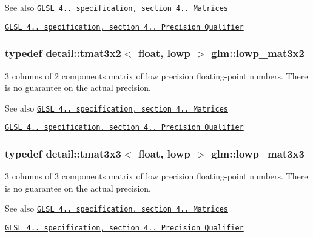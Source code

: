 \begin{DoxySeeAlso}{See also}
\href{http://www.opengl.org/registry/doc/GLSLangSpec.4.20.8.pdf}{\tt G\+L\+SL 4.. specification, section 4.. Matrices} 

\href{http://www.opengl.org/registry/doc/GLSLangSpec.4.20.8.pdf}{\tt G\+L\+SL 4.. specification, section 4.. Precision Qualifier} 
\end{DoxySeeAlso}
\subsubsection[{\texorpdfstring{lowp\+\_\+mat3x2}{lowp_mat3x2}}]{\setlength{\rightskip}{0pt plus 5cm}typedef detail\+::tmat3x2$<$ float, lowp $>$ {\bf glm\+::lowp\+\_\+mat3x2}}\hypertarget{group__core__precision_ga17219f89f804dbf4620d4caacf32cfe2}{}\label{group__core__precision_ga17219f89f804dbf4620d4caacf32cfe2}
3 columns of 2 components matrix of low precision floating-\/point numbers. There is no guarantee on the actual precision.

\begin{DoxySeeAlso}{See also}
\href{http://www.opengl.org/registry/doc/GLSLangSpec.4.20.8.pdf}{\tt G\+L\+SL 4.. specification, section 4.. Matrices} 

\href{http://www.opengl.org/registry/doc/GLSLangSpec.4.20.8.pdf}{\tt G\+L\+SL 4.. specification, section 4.. Precision Qualifier} 
\end{DoxySeeAlso}
\subsubsection[{\texorpdfstring{lowp\+\_\+mat3x3}{lowp_mat3x3}}]{\setlength{\rightskip}{0pt plus 5cm}typedef detail\+::tmat3x3$<$ float, lowp $>$ {\bf glm\+::lowp\+\_\+mat3x3}}\hypertarget{group__core__precision_ga31688b397d10806ead332c3adb7dc0f0}{}\label{group__core__precision_ga31688b397d10806ead332c3adb7dc0f0}
3 columns of 3 components matrix of low precision floating-\/point numbers. There is no guarantee on the actual precision.

\begin{DoxySeeAlso}{See also}
\href{http://www.opengl.org/registry/doc/GLSLangSpec.4.20.8.pdf}{\tt G\+L\+SL 4.. specification, section 4.. Matrices} 

\href{http://www.opengl.org/registry/doc/GLSLangSpec.4.20.8.pdf}{\tt G\+L\+SL 4.. specification, section 4.. Precision Qualifier} 
\end{DoxySeeAlso}
